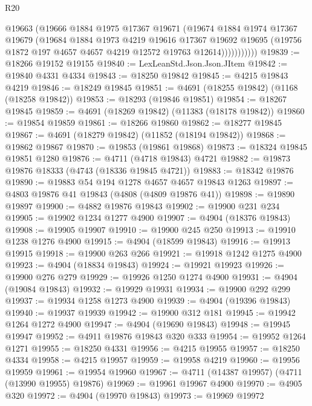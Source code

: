 \begin{lexlean}{R20}
\begin{coremodule}
                  @19663
                  (@19666
                    @1884
                    @1975
                    @17367
                    @19671
                    (@19674
                      @1884
                      @1974
                      @17367
                      @19679
                      (@19684
                        @1884
                        @1973
                        @4219
                        @19616
                        @17367
                        @19692
                        @19695
                        (@19756 @1872 @197 @4657 @4657 @4219 @12572 @19763 @12614)))))))))))
@19839 := @18266 @19152 @19155
@19840 := LexLeanStd.Json.Json.JItem
@19842 := @19840 @4331 @4334
@19843 := @18250 @19842
@19845 := @4215 @19843 @4219
@19846 := @18249 @19845
@19851 := @4691 (@18255 @19842) (@1168 (@18258 @19842))
@19853 := @18293 (@19846 @19851)
@19854 := @18267 @19845
@19859 := @4691 (@18269 @19842) (@11383 (@18178 @19842))
@19860 := @19854 @19859
@19861 := @18266 @19860
@19862 := @18277 @19845
@19867 := @4691 (@18279 @19842) (@11852 (@18194 @19842))
@19868 := @19862 @19867
@19870 := @19853 (@19861 @19868)
@19873 := @18324 @19845 @19851 @1280
@19876 := @4711 (@4718 @19843) @4721
@19882 := @19873 @19876 @18333 (@4743 (@18336 @19845 @4721))
@19883 := @18342 @19876
@19890 := @19883 @54 @194 @1278 @4657 @4657 @19843 @1263
@19897 := @4803 @19876 @41 @19843 (@4808 (@4809 @19876 @41))
@19898 := @19890 @19897
@19900 := @4882 @19876 @19843
@19902 := @19900 @231 @234
@19905 := @19902 @1234 @1277 @4900
@19907 := @4904 (@18376 @19843)
@19908 := @19905 @19907
@19910 := @19900 @245 @250
@19913 := @19910 @1238 @1276 @4900
@19915 := @4904 (@18599 @19843)
@19916 := @19913 @19915
@19918 := @19900 @263 @266
@19921 := @19918 @1242 @1275 @4900
@19923 := @4904 (@18834 @19843)
@19924 := @19921 @19923
@19926 := @19900 @276 @279
@19929 := @19926 @1250 @1274 @4900
@19931 := @4904 (@19084 @19843)
@19932 := @19929 @19931
@19934 := @19900 @292 @299
@19937 := @19934 @1258 @1273 @4900
@19939 := @4904 (@19396 @19843)
@19940 := @19937 @19939
@19942 := @19900 @312 @181
@19945 := @19942 @1264 @1272 @4900
@19947 := @4904 (@19690 @19843)
@19948 := @19945 @19947
@19952 := @4911 @19876 @19843 @320 @333
@19954 := @19952 @1264 @1271
@19955 := @18250 @4331
@19956 := @4215 @19955
@19957 := @18250 @4334
@19958 := @4215 @19957
@19959 := @19958 @4219
@19960 := @19956 @19959
@19961 := @19954 @19960
@19967 := @4711 (@14387 @19957) (@4711 (@13990 @19955) @19876)
@19969 := @19961 @19967 @4900
@19970 := @4905 @320
@19972 := @4904 (@19970 @19843)
@19973 := @19969 @19972

\end{coremodule}
\end{lexlean}
